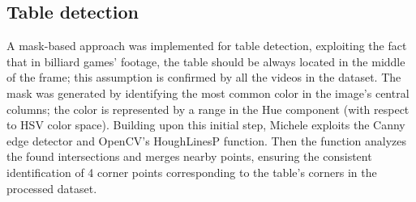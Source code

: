 \subsection{Table detection}
A mask-based approach was implemented for table detection, exploiting the fact that in billiard games' footage, the table should be always located in the middle of the frame; this assumption is confirmed by all the videos in the dataset.
The mask was generated by identifying the most common color in the image's central columns; the color is represented by a range in the Hue component (with respect to HSV color space).
Building upon this initial step, Michele exploits the Canny edge detector and OpenCV's HoughLinesP function.
Then the function analyzes the found intersections and merges nearby points, ensuring the consistent identification of 4 corner points corresponding to the table's corners in the processed dataset.
